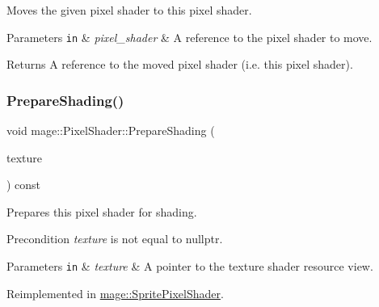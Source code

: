 Moves the given pixel shader to this pixel shader.


\begin{DoxyParams}[1]{Parameters}
\mbox{\tt in}  & {\em pixel\+\_\+shader} & A reference to the pixel shader to move. \\
\hline
\end{DoxyParams}
\begin{DoxyReturn}{Returns}
A reference to the moved pixel shader (i.\+e. this pixel shader). 
\end{DoxyReturn}
\hypertarget{classmage_1_1_pixel_shader_ab677013145ca252c57e5a001134c01ff}{}\label{classmage_1_1_pixel_shader_ab677013145ca252c57e5a001134c01ff} 
\subsubsection{\texorpdfstring{Prepare\+Shading()}{PrepareShading()}\hspace{0.1cm}{\footnotesize\ttfamily [1/2]}}
{\footnotesize\ttfamily void mage\+::\+Pixel\+Shader\+::\+Prepare\+Shading (\begin{DoxyParamCaption}\item[{I\+D3\+D11\+Shader\+Resource\+View $\ast$}]{texture }\end{DoxyParamCaption}) const\hspace{0.3cm}{\ttfamily [virtual]}}

Prepares this pixel shader for shading.

\begin{DoxyPrecond}{Precondition}
{\itshape texture} is not equal to {\ttfamily nullptr}. 
\end{DoxyPrecond}

\begin{DoxyParams}[1]{Parameters}
\mbox{\tt in}  & {\em texture} & A pointer to the texture shader resource view. \\
\hline
\end{DoxyParams}


Reimplemented in \hyperlink{classmage_1_1_sprite_pixel_shader_a8c0c4daf36c74822a772b1a38e8d876a}{mage\+::\+Sprite\+Pixel\+Shader}.

\hypertarget{classmage_1_1_pixel_shader_a5a1a58bcb0ed64405e746ec7a5af5269}{}\label{classmage_1_1_pixel_shader_a5a1a58bcb0ed64405e746ec7a5af5269} 
